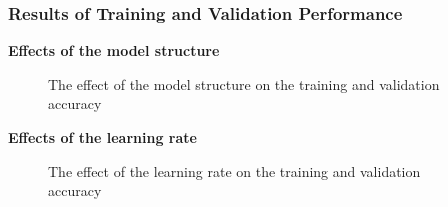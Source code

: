 \documentclass[a4paper]{article}
\begin{document}
\subsubsection{Results of Training and Validation Performance} \label{ann_model_result_hyperparameter}
\textbf{Effects of the model structure}

\begin{figure} [htbp]
    \caption{The effect of the model structure on the training and validation accuracy} 
    \label{fig:mnist_ann_result_modelstructure}
\end{figure}

\textbf{Effects of the learning rate}

\begin{figure} [htbp]
    \caption{The effect of the learning rate on the training and validation accuracy} 
    \label{fig:mnist_ann_result_learningrate}
\end{figure}
\end{document}
